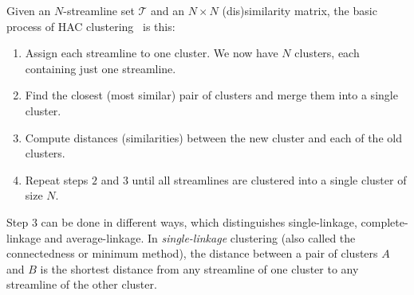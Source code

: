 Given an $N$-streamline set $\mathcal{T}$
and an $N\times N$ (dis)similarity matrix, the basic process of HAC clustering~\cite{johnson1967hierarchical} is this:
\begin{enumerate}
	\item Assign each streamline to one cluster. We now have $N$ clusters, each containing just one streamline.
	\item Find the closest (most similar) pair of clusters and merge them into a single cluster.
	\item Compute distances (similarities) between the new cluster and each of the old clusters.
	\item Repeat steps $2$ and $3$ until all streamlines are clustered into a single cluster of size $N$.
\end{enumerate}
Step $3$ can be done in different ways, which distinguishes single-linkage, complete-linkage and average-linkage.
In \emph{single-linkage} clustering (also called the connectedness or minimum method), the distance between a pair of clusters $A$ and $B$ is the shortest distance from any streamline of one cluster to any streamline of the other cluster. 
